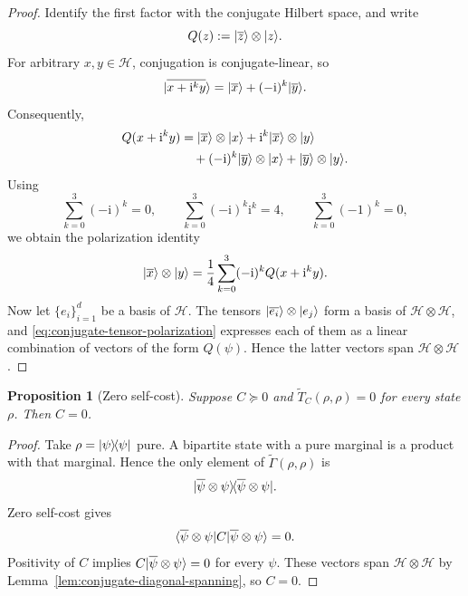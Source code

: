 \documentclass[11pt]{article}
\newtheorem{proposition}[theorem]{Proposition}
\newcommand{\ketbra}[2]{\ensuremath{\ket{#1}\!\bra{#2}}}
\DeclarePairedDelimiter\ket{\lvert}{\rangle}
\DeclarePairedDelimiter\bra{\langle}{\rvert}
\newcommand{\calH}{\mathcal{H}}
\begin{document}
\begin{proof}
    Identify the first factor with the conjugate Hilbert space, and write
    \[
        Q(z):=\ket{\overline z}\otimes\ket z.
    \]
    For arbitrary $x,y\in\calH$, conjugation is conjugate-linear, so
    \[
        \ket{\overline{x+\mathrm{i}^k y}}
        =\ket{\overline x}+(-\mathrm{i})^k\ket{\overline y}.
    \]
    Consequently,
    \begin{align*}
        Q(x+\mathrm{i}^k y)
        &={}
        \ket{\overline x}\otimes\ket x
        +\mathrm{i}^k\ket{\overline x}\otimes\ket y\\
        &\quad
        +(-\mathrm{i})^k\ket{\overline y}\otimes\ket x
        +\ket{\overline y}\otimes\ket y.
    \end{align*}
    Using
    \[
        \sum_{k=0}^3(-\mathrm{i})^k=0,
        \qquad
        \sum_{k=0}^3(-\mathrm{i})^k\mathrm{i}^k=4,
        \qquad
        \sum_{k=0}^3(-1)^k=0,
    \]
    we obtain the polarization identity
    \begin{equation}\label{eq:conjugate-tensor-polarization}
        \ket{\overline x}\otimes\ket y
        =\frac14\sum_{k=0}^3(-\mathrm{i})^k
        Q(x+\mathrm{i}^k y).
    \end{equation}
    Now let $\{e_i\}_{i=1}^d$ be a basis of $\calH$.  The tensors
    $\ket{\overline{e_i}}\otimes\ket{e_j}$ form a basis of
    $\calH\otimes\calH$, and \eqref{eq:conjugate-tensor-polarization}
    expresses each of them as a linear combination of vectors of the form
    $Q(\psi)$.  Hence the latter vectors span $\calH\otimes\calH$.
\end{proof}

\begin{proposition}[Zero self-cost]\label{prop:channel-zero-self-cost}
    Suppose $C\succeq0$ and
    $\widetilde T_C(\rho,\rho)=0$ for every state $\rho$.  Then $C=0$.
\end{proposition}

\begin{proof}
    Take $\rho=\ketbra{\psi}{\psi}$ pure.  A bipartite state with a pure
    marginal is a product with that marginal.  Hence the only element of
    $\widetilde\Gamma(\rho,\rho)$ is
    \[
        \ketbra{\overline\psi\otimes\psi}
                {\overline\psi\otimes\psi}.
    \]
    Zero self-cost gives
    \[
        \bra{\overline\psi\otimes\psi}
        C
        \ket{\overline\psi\otimes\psi}=0.
    \]
    Positivity of $C$ implies
    $C\ket{\overline\psi\otimes\psi}=0$ for every $\psi$.  These vectors
    span $\calH\otimes\calH$ by
    Lemma~\ref{lem:conjugate-diagonal-spanning}, so $C=0$.
\end{proof}
\end{document}
